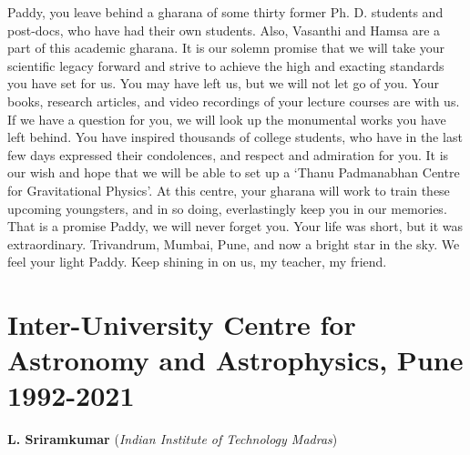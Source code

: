 \documentclass[prd, preprint, longbibliography, 11pt]{revtex4-1}
\begin{document}
Paddy, you leave behind a gharana of some thirty former Ph. D. students and post-docs, who have had their own students. Also, Vasanthi and Hamsa are  a part of this academic gharana. It is our solemn promise that we will take your scientific legacy forward and strive to achieve the high and exacting standards you have set for us. You may have left us, but we will not let go of you. Your books, research articles, and video recordings of your lecture courses are with us. If we have a question for you, we will look up the monumental works you have left behind. You have inspired thousands of college students, who have in the last few days expressed their condolences, and respect and admiration for you. It is our wish and hope that we will be able to set up a `Thanu Padmanabhan Centre for Gravitational Physics’. At this centre, your gharana will work to train these upcoming youngsters, and in so doing, everlastingly keep you in our memories. That is a promise Paddy, we will never forget you. Your life was short, but it was extraordinary. Trivandrum, Mumbai, Pune, and now a bright star in the sky. We feel your light Paddy. Keep shining in on us, my teacher, my friend.

\section{Inter-University Centre for Astronomy and Astrophysics, Pune 1992-2021} 

\centerline{{\bf L. Sriramkumar} ({\it Indian Institute of Technology Madras})}
\medskip
{}

\noindent
\end{document}

